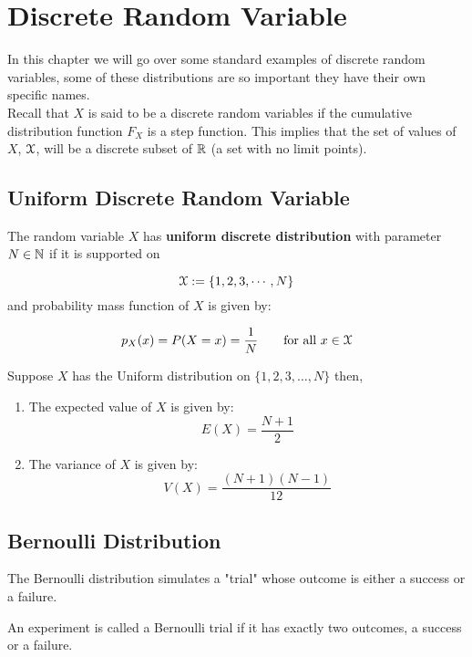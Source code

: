 \chapter[Discrete Random Variables]{Discrete Random Variable}
In this chapter we will go over some standard examples of discrete random variables, some of these distributions are so important they have their own specific names. 
\\

Recall that $X$ is said to be a discrete random variables if the cumulative distribution function $F_X$ is a step function. This implies that the set of values of $X$, $\mathcal{X}$, will be a discrete subset of $\mathbb{R}$ (a set with no limit points).

\section[Uniform Discrete Random Variable]{Uniform Discrete Random Variable}
\begin{defn}
The random variable $X$ has \textbf{uniform discrete distribution} with parameter $N\in \mathbb{N}$ if it is supported on

$$\mathcal{X}:=\{1,2,3,\cdots,N\}$$
and probability mass function of $X$ is given by:

$$p_X(x)=P(X=x)=\frac{1}{N} \quad \quad \text{for all $x\in \mathcal{X}$}$$
\end{defn}

\begin{thm}
    Suppose $X$ has the Uniform distribution on $\{1, 2, 3, \dots, N\}$ then,
    \begin{enumerate}
        \item The expected value of $X$ is given by:
        $$E(X) = \frac{N+1}{2}$$
        \item The variance of $X$ is given by:
        $$V(X) = \frac{(N+1)(N-1)}{12}$$
    \end{enumerate}
\end{thm}

\section[Bernoulli Distribution]{Bernoulli Distribution}
The Bernoulli distribution simulates a "trial" whose outcome is either a success or a failure. 

\begin{defn}
An experiment is called a Bernoulli trial if it has exactly two outcomes, a success or a failure. 
\end{defn}

